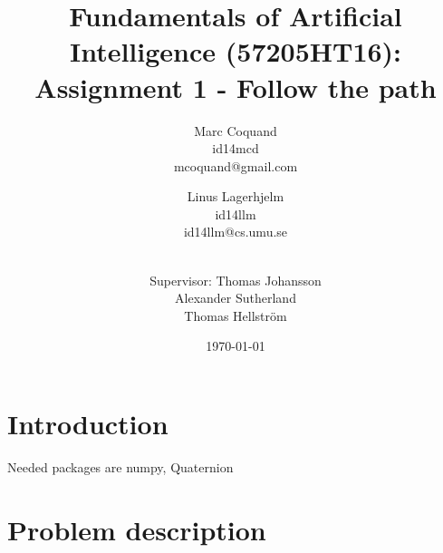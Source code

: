 \documentclass[12pt]{article}
\title{Fundamentals of Artificial Intelligence (57205HT16): Assignment 1 -
Follow the path}
\author{
    Marc Coquand \\ 
    id14mcd \\
    mcoquand@gmail.com \and
		Linus Lagerhjelm \\
		id14llm \\
		id14llm@cs.umu.se \and \\
		Supervisor: Thomas Johansson\\
		Alexander Sutherland \\
		Thomas Hellström
}
\date{\today}
\begin{document}
\maketitle

\newpage
\section{Introduction}

Needed packages are numpy, Quaternion 

\section{Problem description}





\end{document}
